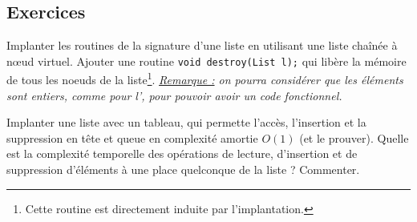 \documentclass[../../../main.tex]{subfiles}
\begin{document}

\subsection{Exercices}
 Implanter les routines de la signature d'une liste en utilisant une liste chaînée à n\oe{}ud virtuel. Ajouter une routine \texttt{void destroy(List l);} qui libère la mémoire de tous les noeuds de la liste\footnote{Cette routine est directement induite par l'implantation.}. \newline
\textit{\underline{Remarque :} on pourra considérer que les éléments sont entiers, comme pour l', pour pouvoir avoir un code fonctionnel.}

 Implanter une liste avec un tableau, qui permette l'accès, l'insertion et la suppression en tête et queue en complexité amortie $O(1)$ (et le prouver). Quelle est la complexité temporelle des opérations de lecture, d'insertion et de suppression d'éléments à une place quelconque de la liste ? Commenter.
\end{document}

